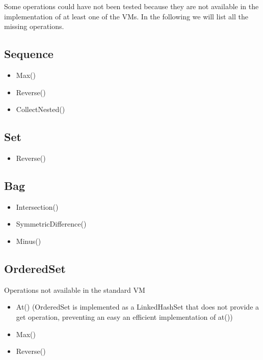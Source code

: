 Some operations could have not been tested because they are not available in the
implementation of at least one of the VMs. In the following we will list all the
missing operations.

\subsection{Sequence}

\begin{itemize}
  \item Max()
  \item Reverse()
  \item CollectNested()
\end{itemize}

\subsection{Set}

\begin{itemize}
  \item Reverse()
\end{itemize}

\subsection{Bag}

\begin{itemize}
  \item Intersection()
  \item SymmetricDifference()
  \item Minus()
\end{itemize}

\subsection{OrderedSet}
 
 Operations not available in the standard VM

\begin{itemize}
  \item At() (OrderedSet is implemented as a LinkedHashSet that does not
  provide a get operation, preventing an easy an efficient implementation of at())
  \item Max()
  \item Reverse()
\end{itemize}



